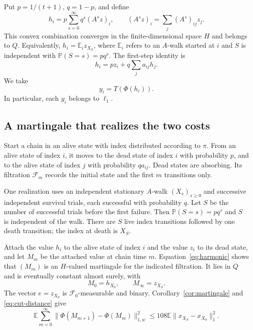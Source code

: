 \documentclass[11pt]{article}
\theoremstyle{definition}
\theoremstyle{remark}
\numberwithin{equation}{section}
\newcommand{\E}{\mathbb E}
\newcommand{\Prob}{\mathbb P}
\newcommand{\calF}{\mathcal F}
\begin{document}
Put $p=1/(t+1)$, $q=1-p$, and define
\begin{equation}\label{eq:resolvent}
 h_i=p\sum_{s=0}^\infty q^s(A^s z)_i,
 \qquad (A^s z)_i=\sum_j(A^s)_{ij}z_j.
\end{equation}
This convex combination converges in the finite-dimensional
space $H$ and belongs to $Q$. Equivalently,
$h_i=\E_i z_{X_S}$, where $\E_i$ refers to an $A$-walk started
at $i$ and $S$ is independent with $\Prob(S=s)=pq^s$.
The first-step identity is
\begin{equation}\label{eq:harmonic}
 h_i=pz_i+q\sum_j a_{ij}h_j.
\end{equation}
We take
\begin{equation}\label{eq:y}
 y_i=T(\Phi(h_i)).
\end{equation}
In particular, each $y_i$ belongs to $\ell_1$.

\subsection{A martingale that realizes the two costs}
Start a chain in an alive state with index distributed according
to $\pi$. From an alive state of index $i$, it moves to the
dead state of index $i$ with probability $p$, and to the alive
state of index $j$ with probability $qa_{ij}$. Dead states are
absorbing. Its filtration $\calF_m$ records the initial state
and the first $m$ transitions only.

One realization uses an independent stationary $A$-walk
$(X_s)_{s\geq0}$ and successive independent survival trials,
each successful with probability $q$. Let $S$ be the number of
successful trials before the first failure. Then
$\Prob(S=s)=pq^s$ and $S$ is independent of the walk. There
are $S$ live index transitions followed by one death transition;
the index at death is $X_S$.

Attach the value $h_i$ to the alive state of index $i$ and the
value $z_i$ to its dead state, and let $M_m$ be the attached
value at chain time $m$. Equation~\eqref{eq:harmonic} shows
that $(M_m)$ is an $H$-valued martingale for the indicated
filtration. It lies in $Q$ and is eventually constant almost
surely, with
\[
 M_0=h_{X_0},\qquad M_\infty=z_{X_S}.
\]
The vector $e=z_{X_0}$ is $\calF_0$-measurable and binary.
Corollary~\ref{cor:martingale} and \eqref{eq:cut-distance}
give
\begin{equation}\label{eq:stopped-bound}
 \E\sum_{m=0}^\infty
 \|\Phi(M_{m+1})-\Phi(M_m)\|_{1,w}^2
 \leq108\E\|x_{X_S}-x_{X_0}\|_1^2.
\end{equation}
\end{document}
